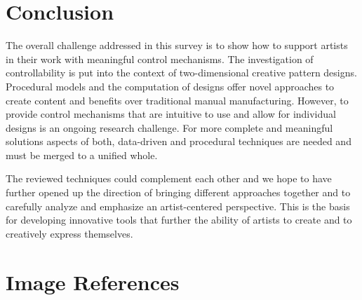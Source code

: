 

\section{Conclusion}
\label{sec:conclusion}

The overall challenge addressed in this survey is to show how to support artists in their work with meaningful control mechanisms. The investigation of controllability is put into the context of two-dimensional creative pattern designs. Procedural models and the computation of designs offer novel approaches to create content and benefits over traditional manual manufacturing. However, to provide control mechanisms that are intuitive to use and allow for individual designs is an ongoing research challenge. For more complete and meaningful solutions aspects of both, data-driven and procedural techniques are needed and must be merged to a unified whole.  

The reviewed techniques could complement each other and we hope to have further opened up the direction of bringing different approaches together and to carefully analyze and emphasize an artist-centered perspective. This is the basis for developing innovative tools that further the ability of artists to create and to creatively express themselves.


\setcounter{secnumdepth}{0} %
\section{Image References}
\label{sec:image_references}

\footnotesize
\sloppy

